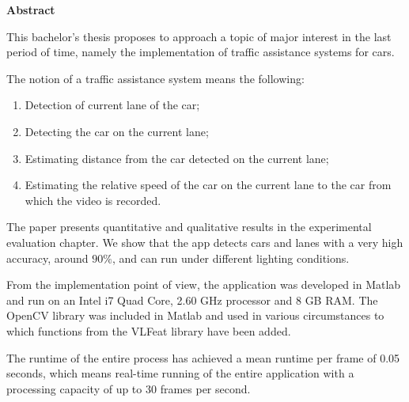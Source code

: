 \thispagestyle{plain}

\begin{center}
	\Large \textbf{Abstract}	
\end{center}

This bachelor's thesis proposes to approach a topic of major interest in the last period of time, namely the implementation of traffic assistance systems for cars.

The notion of a traffic assistance system means the following:

\begin{enumerate}
	\item Detection of current lane of the car;
	\item Detecting the car on the current lane;
	\item Estimating distance from the car detected on the current lane;
	\item Estimating the relative speed of the car on the current lane to the car from which the video is recorded.
\end{enumerate}

The paper presents quantitative and qualitative results in the experimental evaluation chapter. We show that the app detects cars and lanes with a very high accuracy, around $90\%$, and can run under different lighting conditions.

From the implementation point of view, the application was developed in Matlab and run on an Intel i7 Quad Core, 2.60 GHz processor and 8 GB RAM. The OpenCV library was included in Matlab and used in various circumstances to which functions from the VLFeat library have been added.

The runtime of the entire process has achieved a mean runtime per frame of 0.05 seconds, which means real-time running of the entire application with a processing capacity of up to 30 frames per second. 
\vspace*{\fill}